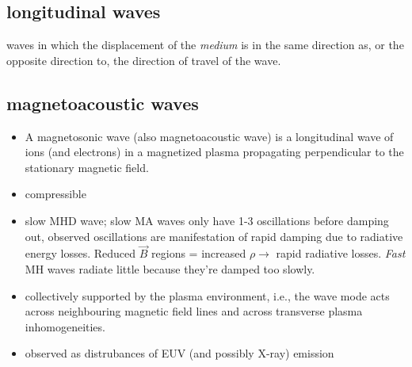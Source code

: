 \documentclass{article}
\begin{document}
\subsection{longitudinal waves}
waves in which the displacement of the \emph{medium} is in the
same direction as, or the opposite direction to,
the direction of travel of the wave.

\subsection{magnetoacoustic waves}
\begin{itemize}
    \item A magnetosonic wave (also magnetoacoustic wave) is a
        longitudinal wave of ions (and electrons) in a magnetized
        plasma propagating perpendicular to the stationary magnetic field.
    \item compressible
    \item slow MHD wave; slow MA waves only have 1-3 oscillations before
        damping out, observed oscillations are manifestation of rapid
        damping due to radiative energy losses. Reduced $\vec{B}$ regions
        = increased $\rho\rightarrow$ rapid radiative losses. \emph{Fast}
        MH waves radiate little because they're damped too slowly.
    \item collectively supported by the plasma environment, i.e., the wave mode acts
        across neighbouring magnetic field lines and across transverse
        plasma inhomogeneities.
    \item observed as distrubances of EUV (and possibly X-ray) emission
\end{itemize}
\end{document}
